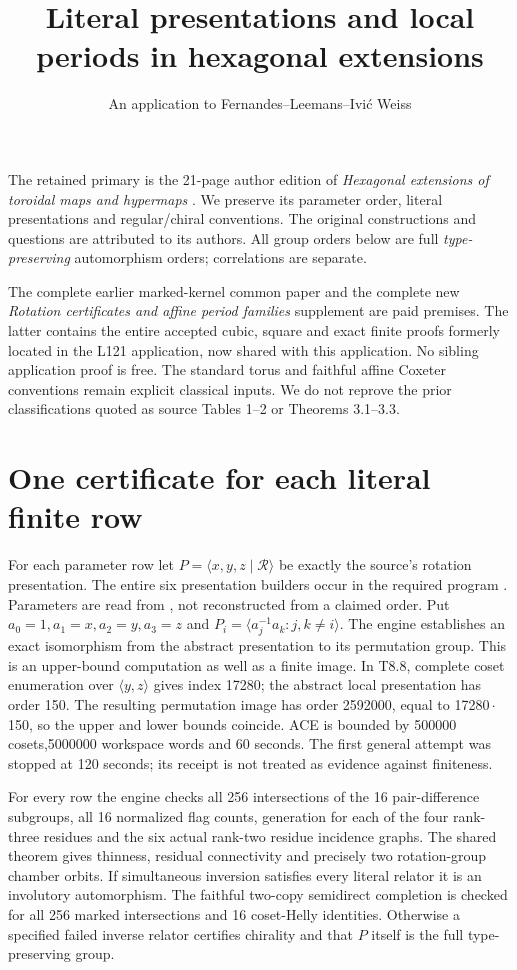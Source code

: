 \documentclass[10pt,a4paper]{article}
\title{Literal presentations and local periods in hexagonal extensions}
\author{An application to Fernandes--Leemans--Ivi\'c Weiss}
\date{}
\newcommand{\gen}[1]{\langle#1\rangle}
\begin{document}
\maketitle
The retained primary is the 21-page author edition of
\emph{Hexagonal extensions of toroidal maps and hypermaps} \cite{source}.
We preserve its parameter order, literal presentations and regular/chiral
conventions. The original constructions and questions are attributed to
its authors. All group orders below are full \emph{type-preserving}
automorphism orders; correlations are separate.

The complete earlier marked-kernel common paper and the complete new
\emph{Rotation certificates and affine period families} supplement are
paid premises. The latter contains the entire accepted cubic, square
and exact finite proofs formerly located in the L121 application, now
shared with this application. No sibling application proof is free.
The standard torus and faithful affine Coxeter conventions remain
explicit classical inputs. We do not reprove the prior classifications
quoted as source Tables 1--2 or Theorems 3.1--3.3.

\section{One certificate for each literal finite row}
For each parameter row let $P=\gen{x,y,z\mid\mathcal R}$ be exactly the
source's rotation presentation. The entire six presentation builders
occur in the required program .
Parameters are read from , not reconstructed
from a claimed order. Put $a_0=1,a_1=x,a_2=y,a_3=z$ and
$P_i=\gen{a_j^{-1}a_k:j,k\ne i}$.
The engine establishes an exact isomorphism from the abstract
presentation to its permutation group. This is an upper-bound
computation as well as a finite image. In T8.8, complete coset
enumeration over $\gen{y,z}$ gives index 17280; the abstract local
presentation has order 150. The resulting permutation image has
order 2592000, equal to 17280\,$\cdot$\,150, so the upper and lower
bounds coincide. ACE is bounded by 500000 cosets,5000000 workspace
words and 60 seconds. The first general attempt was stopped at 120
seconds; its receipt is not treated as evidence against finiteness.

For every row the engine checks all 256 intersections of the 16
pair-difference subgroups, all 16 normalized flag counts, generation
for each of the four rank-three residues and the six actual rank-two
residue incidence graphs. The shared theorem gives thinness, residual
connectivity and precisely two rotation-group chamber orbits.
If simultaneous inversion satisfies every literal relator it is an
involutory automorphism. The faithful two-copy semidirect completion
is checked for all 256 marked intersections and 16 coset-Helly identities.
Otherwise a specified failed inverse relator certifies chirality and
that $P$ itself is the full type-preserving group.
\end{document}
